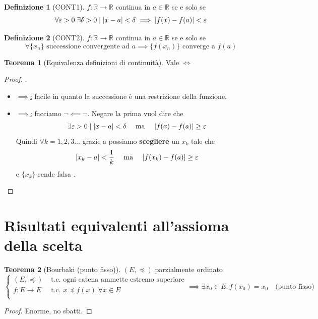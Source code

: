 \documentclass[a4paper,10pt]{article}
\theoremstyle{definition}
\newcommand{\re}{\mathbb{R}} %
\theoremstyle{indentdefinition}
\newtheorem{defn}{Definizione}[section]
\theoremstyle{indentpostulate}
\theoremstyle{indenttheorem}
\newtheorem{thm}{Teorema}[section]
\theoremstyle{myremark}
\theoremstyle{indentgeneral}
\newenvironment{myboxed} 
{\noindent\begin{lrbox}{\mybox}\begin{minipage}{\textwidth}}
{\end{minipage}\end{lrbox}\fbox{\usebox{\mybox}}}
\begin{document}
\begin{defn}[CONT1]\label{defn-cont1}
    $f:\re\to\re$ continua in $a\in\re$ se e solo se
    $$\forall\varepsilon>0\;\exists\delta>0\mid \abs{x-a}<\delta\implies\abs{f(x)-f(a)}<\varepsilon$$
\end{defn}

\begin{defn}[CONT2]\label{defn-cont2}
    $f:\re\to\re$ continua in $a\in\re$ se e solo se
    $$\forall\{x_n\} \text{ successione convergente ad }a\implies\{f(x_n)\} \text{ converge a }f(a)$$
\end{defn}

\begin{myboxed}
    \begin{thm}[Equivalenza definizioni di continuità]
        Vale $\iff$
    \end{thm}
\end{myboxed}
\begin{proof}.
    \begin{itemize}
        \item \underline{$\implies$:} facile in quanto la successione è una restrizione della funzione.
        \item \underline{$\implies$:} facciamo  $\neg\impliedby\neg$. Negare la prima vuol dire che
        $$\exists \varepsilon>0\mid \abs{x-a}<\delta \quad \text{ ma }\quad\abs{f(x)-f(a)}\ge\varepsilon$$
        Quindi $\forall k=1,2,3\dots$ grazie a  possiamo \textbf{scegliere} un $x_k$ tale che 
        $$\abs{x_k-a}<\frac{1}{k}\quad \text{ ma }\quad\abs{f(x_k)-f(a)}\ge\varepsilon$$
        e $\{x_k\}$ rende falsa .
    \end{itemize}
\end{proof}

\pagebreak{}
\section{Risultati equivalenti all’assioma della scelta}

\begin{myboxed}
\begin{thm}[Bourbaki (punto fisso)] \label{thm-bourbaki} $(E,\preceq)$ parzialmente ordinato
$$\begin{cases}
    (E,\preceq) &\text{ t.c. ogni catena ammette estremo superiore}\\
    f:E\to E &\text{ t.c. }x\preceq f(x)\;\forall x\in E\\
\end{cases}\implies \exists x_0\in E: f(x_0)=x_0 \quad \text{(punto fisso)}$$
\end{thm}
\end{myboxed}
\begin{proof}
    Enorme, no sbatti.
\end{proof}
\end{document}

